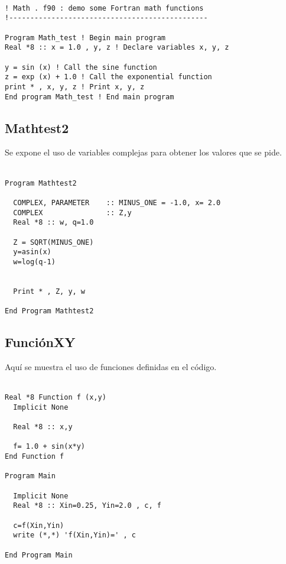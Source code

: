 \documentclass{article}
\begin{document}
\begin{Verbatim}[frame=single]

! Math . f90 : demo some Fortran math functions
!-----------------------------------------------

Program Math_test ! Begin main program
Real *8 :: x = 1.0 , y, z ! Declare variables x, y, z

y = sin (x) ! Call the sine function
z = exp (x) + 1.0 ! Call the exponential function
print * , x, y, z ! Print x, y, z
End program Math_test ! End main program

\end{Verbatim}


\subsection*{Mathtest2}
Se expone el uso de variables complejas para obtener los valores que se pide.\\ \\

	
	
		
\begin{Verbatim}[frame=single]
Program Mathtest2
  
  COMPLEX, PARAMETER    :: MINUS_ONE = -1.0, x= 2.0
  COMPLEX               :: Z,y
  Real *8 :: w, q=1.0

  Z = SQRT(MINUS_ONE)
  y=asin(x)
  w=log(q-1)

  
  Print * , Z, y, w

End Program Mathtest2

\end{Verbatim}
	
\subsection*{Funci\'onXY}
Aqu\'i se muestra el uso de funciones definidas en el c\'odigo.\\ \\
	
	
		
\begin{Verbatim}[frame=single]
Real *8 Function f (x,y)
  Implicit None

  Real *8 :: x,y 

  f= 1.0 + sin(x*y)
End Function f

Program Main

  Implicit None
  Real *8 :: Xin=0.25, Yin=2.0 , c, f

  c=f(Xin,Yin)
  write (*,*) 'f(Xin,Yin)=' , c

End Program Main

\end{Verbatim}
\end{document}
